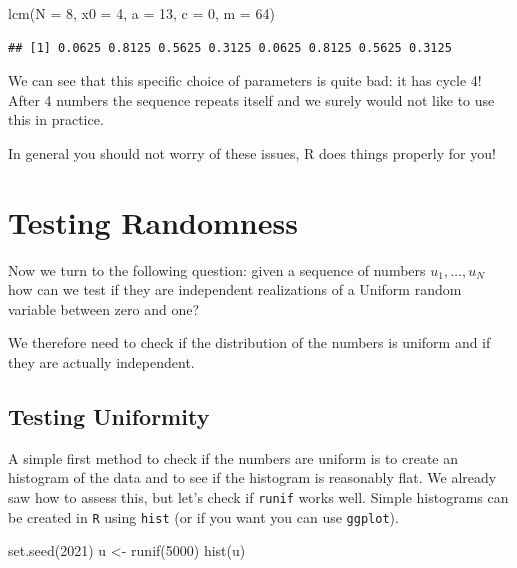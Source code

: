 \documentclass[
]{book}
\newenvironment{Shaded}{\begin{snugshade}}{\end{snugshade}}
\newcommand{\AttributeTok}[1]{\textcolor[rgb]{0.77,0.63,0.00}{#1}}
\newcommand{\DecValTok}[1]{\textcolor[rgb]{0.00,0.00,0.81}{#1}}
\newcommand{\FunctionTok}[1]{\textcolor[rgb]{0.00,0.00,0.00}{#1}}
\newcommand{\NormalTok}[1]{#1}
\newcommand{\OtherTok}[1]{\textcolor[rgb]{0.56,0.35,0.01}{#1}}
\begin{document}
\begin{Shaded}
\begin{Highlighting}[]
\FunctionTok{lcm}\NormalTok{(}\AttributeTok{N =} \DecValTok{8}\NormalTok{, }\AttributeTok{x0 =} \DecValTok{4}\NormalTok{, }\AttributeTok{a =} \DecValTok{13}\NormalTok{, }\AttributeTok{c =} \DecValTok{0}\NormalTok{, }\AttributeTok{m =} \DecValTok{64}\NormalTok{)}
\end{Highlighting}
\end{Shaded}

\begin{verbatim}
## [1] 0.0625 0.8125 0.5625 0.3125 0.0625 0.8125 0.5625 0.3125
\end{verbatim}

We can see that this specific choice of parameters is quite bad: it has cycle 4! After 4 numbers the sequence repeats itself and we surely would not like to use this in practice.

In general you should not worry of these issues, R does things properly for you!

\hypertarget{testing-randomness}{%
\section{Testing Randomness}\label{testing-randomness}}

Now we turn to the following question: given a sequence of numbers \(u_1,\dots,u_N\) how can we test if they are independent realizations of a Uniform random variable between zero and one?

We therefore need to check if the distribution of the numbers is uniform and if they are actually independent.

\hypertarget{testing-uniformity}{%
\subsection{Testing Uniformity}\label{testing-uniformity}}

A simple first method to check if the numbers are uniform is to create an histogram of the data and to see if the histogram is reasonably flat. We already saw how to assess this, but let's check if \texttt{runif} works well. Simple histograms can be created in \texttt{R} using \texttt{hist} (or if you want you can use \texttt{ggplot}).

\begin{Shaded}
\begin{Highlighting}[]
\FunctionTok{set.seed}\NormalTok{(}\DecValTok{2021}\NormalTok{)}
\NormalTok{u }\OtherTok{\textless{}{-}} \FunctionTok{runif}\NormalTok{(}\DecValTok{5000}\NormalTok{)}
\FunctionTok{hist}\NormalTok{(u)}
\end{Highlighting}
\end{Shaded}
\end{document}

